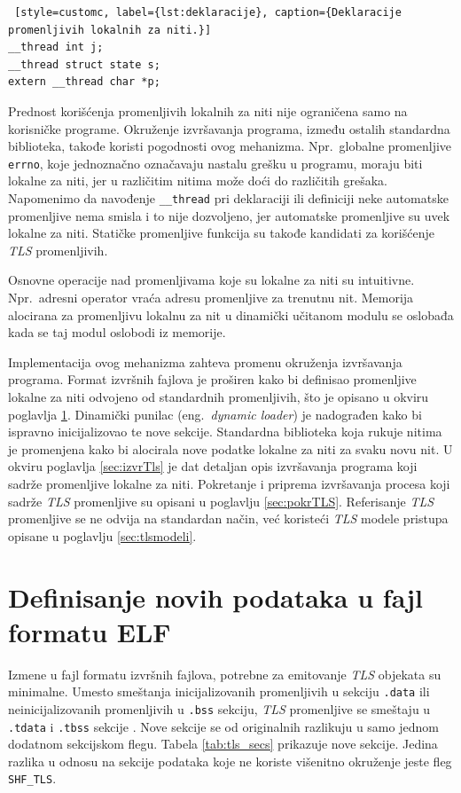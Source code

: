 \documentclass[12pt,oneside]{memoir}
\begin{document}
\begin{lstlisting} [style=customc, label={lst:deklaracije}, caption={Deklaracije promenljivih lokalnih za niti.}]
__thread int j;
__thread struct state s;
extern __thread char *p;
\end{lstlisting}

Prednost korišćenja promenljivih lokalnih za niti nije ograničena samo na korisničke programe. Okruženje izvršavanja programa, između ostalih standardna biblioteka, takođe koristi pogodnosti ovog mehanizma. Npr.~globalne promenljive \texttt{errno}, koje jednoznačno označavaju nastalu grešku u programu, moraju biti lokalne za niti, jer u različitim nitima može doći do različitih grešaka. Napomenimo da navođenje \texttt{\_\_thread} pri deklaraciji ili definiciji neke automatske promenljive nema smisla i to nije dozvoljeno, jer automatske promenljive su uvek lokalne za niti.  Statičke promenljive funkcija su takođe kandidati za korišćenje \emph{TLS} promenljivih.

Osnovne operacije nad promenljivama koje su lokalne za niti su intuitivne. Npr.~adresni operator vraća adresu promenljive za trenutnu nit. Memorija alocirana za promenljivu lokalnu za nit u dinamički učitanom modulu se oslobađa kada se taj modul oslobodi iz memorije.

Implementacija ovog mehanizma zahteva promenu okruženja izvršavanja programa. Format izvršnih fajlova je proširen kako bi definisao promenljive lokalne za niti odvojeno od standardnih promenljivih, što je opisano u okviru poglavlja \ref{sec:defElfTls}. Dinamički punilac (eng.~\emph{dynamic loader}) je nadograđen kako bi ispravno inicijalizovao te nove sekcije. Standardna biblioteka koja rukuje nitima je promenjena kako bi alocirala nove podatke lokalne za niti za svaku novu nit. U okviru poglavlja \ref{sec:izvrTls} je dat detaljan opis izvršavanja programa koji sadrže promenljive lokalne za niti. Pokretanje i priprema izvršavanja procesa koji sadrže \emph{TLS} promenljive su opisani u poglavlju \ref{sec:pokrTLS}. Referisanje \emph{TLS} promenljive se ne odvija na standardan način, već koristeći \emph{TLS} modele pristupa opisane u poglavlju \ref{sec:tlsmodeli}.

\section{Definisanje novih podataka u fajl formatu ELF}
\label{sec:defElfTls}

Izmene u fajl formatu izvršnih fajlova, potrebne za emitovanje \emph{TLS} objekata su minimalne. Umesto smeštanja inicijalizovanih promenljivih u sekciju \texttt{.data} ili neinicijalizovanih promenljivih u \texttt{.bss} sekciju, \emph{TLS} promenljive se smeštaju u \texttt{.tdata} i \texttt{.tbss} sekcije \cite{TLS}. Nove sekcije se od originalnih razlikuju u samo jednom dodatnom sekcijskom flegu. Tabela \ref{tab:tls_secs} prikazuje nove sekcije. Jedina razlika u odnosu na sekcije podataka koje ne koriste višenitno okruženje jeste fleg \texttt{SHF\_TLS}.
\end{document}
